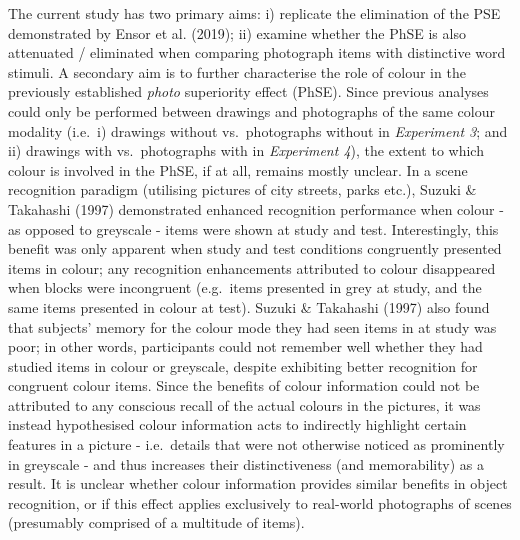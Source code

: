 \documentclass[
  11pt,
]{article}
\begin{document}
The current study has two primary aims: i) replicate the elimination of
the PSE demonstrated by Ensor et al. (2019); ii) examine whether the
PhSE is also attenuated / eliminated when comparing photograph items
with distinctive word stimuli. A secondary aim is to further
characterise the role of colour in the previously established
\emph{photo} superiority effect (PhSE). Since previous analyses could
only be performed between drawings and photographs of the same colour
modality (i.e.~i) drawings without vs.~photographs without in
\emph{Experiment 3}; and ii) drawings with vs.~photographs with in
\emph{Experiment 4}), the extent to which colour is involved in the
PhSE, if at all, remains mostly unclear. In a scene recognition paradigm
(utilising pictures of city streets, parks etc.), Suzuki \& Takahashi
(1997) demonstrated enhanced recognition performance when colour - as
opposed to greyscale - items were shown at study and test.
Interestingly, this benefit was only apparent when study and test
conditions congruently presented items in colour; any recognition
enhancements attributed to colour disappeared when blocks were
incongruent (e.g.~items presented in grey at study, and the same items
presented in colour at test). Suzuki \& Takahashi (1997) also found that
subjects' memory for the colour mode they had seen items in at study was
poor; in other words, participants could not remember well whether they
had studied items in colour or greyscale, despite exhibiting better
recognition for congruent colour items. Since the benefits of colour
information could not be attributed to any conscious recall of the
actual colours in the pictures, it was instead hypothesised colour
information acts to indirectly highlight certain features in a picture -
i.e.~details that were not otherwise noticed as prominently in greyscale
- and thus increases their distinctiveness (and memorability) as a
result. It is unclear whether colour information provides similar
benefits in object recognition, or if this effect applies exclusively to
real-world photographs of scenes (presumably comprised of a multitude of
items).
\end{document}
